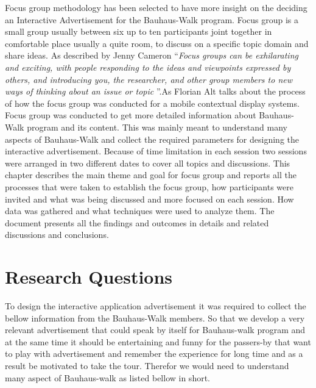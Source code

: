 Focus group methodology has been selected to have more insight on the deciding an Interactive Advertisement for the Bauhaus-Walk program. Focus group is a small group usually between six up to ten participants joint together in comfortable place usually a quite room, to discuss on a specific topic domain and share ideas. As described by Jenny Cameron ``\emph{Focus groups can be exhilarating and exciting, with people responding to the ideas and viewpoints expressed by others, and introducing you, the researcher, and other group members to new ways of thinking about an issue or topic }''\cite{FocusGroup}.As Florian Alt \cite{mobile_focus_group}talks about the process of how the focus group was conducted for a mobile contextual display systems. \\

Focus group was conducted to get more detailed information about Bauhaus-Walk program and its content. This was mainly meant to understand many aspects of Bauhaus-Walk and collect the required parameters for designing the interactive advertisement. Because of time limitation in each session two sessions were arranged in two different dates to cover all topics and discussions. This chapter describes the main theme and goal for focus group and reports all the processes that were taken to establish the focus group, how participants were invited and what was being discussed and more focused on each session. How data was gathered and what techniques were used to analyze them. The document presents all the findings and outcomes in details and related discussions and conclusions.\\





\section{Research Questions}
To design the interactive application advertisement it was required to collect the bellow information from the Bauhaus-Walk members. So that we develop a very relevant advertisement that could speak by itself for Bauhaus-walk program and at the same time it should be entertaining and funny for the passers-by that want to play with advertisement and remember the experience for long time and as a result be motivated to take the tour. Therefor we would need to understand many aspect of Bauhaus-walk as listed bellow in short.

